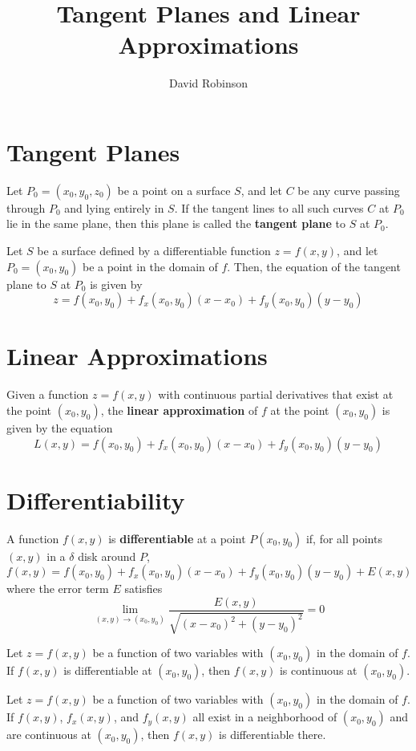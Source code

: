\documentclass{article}
\title{Tangent Planes and Linear Approximations}
\author{David Robinson}
\date{}
\begin{document}
\maketitle

\section*{Tangent Planes}

Let $P_0=(x_0,y_0,z_0)$ be a point on a surface $S$, and let $C$ be any curve passing through $P_0$ and lying entirely in $S$. If the tangent lines to all such curves $C$ at $P_0$ lie in the same plane, then this plane is called the \textbf{tangent plane} to $S$ at $P_0$.
\vspace{1em}

Let $S$ be a surface defined by a differentiable function $z=f(x,y)$, and let $P_0=(x_0,y_0)$ be a point in the domain of $f$. Then, the equation of the tangent plane to $S$ at $P_0$ is given by
\[z=f(x_0,y_0)+f_x(x_0,y_0)(x-x_0)+f_y(x_0,y_0)(y-y_0)\]

\section*{Linear Approximations}

Given a function $z=f(x,y)$ with continuous partial derivatives that exist at the point $(x_0, y_0)$, the \textbf{linear approximation} of $f$ at the point $(x_0,y_0)$ is given by the equation
\[L(x,y)=f(x_0,y_0)+f_x(x_0,y_0)(x-x_0)+f_y(x_0,y_0)(y-y_0)\]

\section*{Differentiability}

A function $f(x,y)$ is \textbf{differentiable} at a point $P(x_0,y_0)$ if, for all points $(x,y)$ in a $\delta$ disk around $P$,
\[f(x,y)=f(x_0,y_0)+f_x(x_0,y_0)(x-x_0)+f_y(x_0,y_0)(y-y_0)+E(x,y)\]
where the error term $E$ satisfies
\[\lim_{(x,y)\rightarrow(x_0,y_0)}\frac{E(x,y)}{\sqrt{{(x-x_0)}^2+{(y-y_0)}^2}}=0\]

Let $z=f(x,y)$ be a function of two variables with $(x_0,y_0)$ in the domain of $f$. If $f(x,y)$ is differentiable at $(x_0,y_0)$, then $f(x,y)$ is continuous at $(x_0,y_0)$.
\vspace{1em}

Let $z=f(x,y)$ be a function of two variables with $(x_0,y_0)$ in the domain of $f$. If $f(x,y)$, $f_x(x,y)$, and $f_y(x,y)$ all exist in a neighborhood of $(x_0,y_0)$ and are continuous at $(x_0,y_0)$, then $f(x,y)$ is differentiable there.
\end{document}
